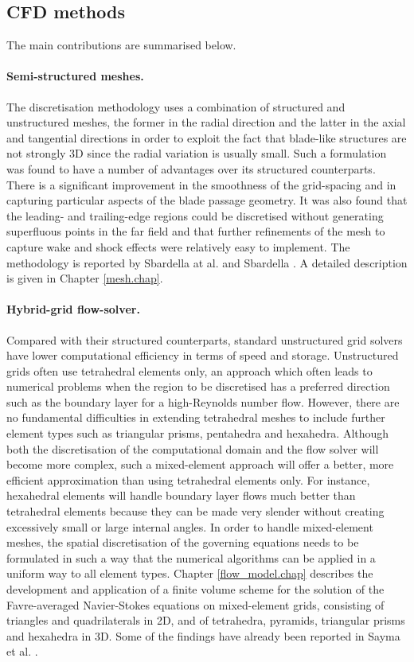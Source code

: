 \subsection{CFD methods}
 The main contributions are summarised below.
%
\paragraph{Semi-structured meshes.}
%
 The discretisation methodology uses a combination of structured and unstructured meshes,
 the former in the radial direction and the latter in the axial and tangential
 directions in order to exploit the fact that blade-like structures
 are not strongly 3D since the radial variation
 is usually small. Such a formulation was found to
 have a number of advantages over its structured counterparts.
 There is a significant improvement
 in the smoothness of the grid-spacing and in capturing
 particular aspects of the blade passage geometry. It was also found that
 the leading- and trailing-edge regions could be  discretised without generating
 superfluous points in the far field and that further refinements of the mesh  
 to capture wake and shock effects were relatively easy to implement.
 The methodology is reported by Sbardella at al. \citeyear{Luca:3,Luca:9}
 and Sbardella \citeyear{Luca:5}. A detailed description is given in
 Chapter \ref{mesh.chap}.
%
\paragraph{Hybrid-grid flow-solver.}
%
 Compared with their structured counterparts, standard unstructured grid
 solvers have lower computational efficiency in terms of speed and storage.
 Unstructured grids often use tetrahedral elements only,
 an approach which often leads to numerical problems when the region to be discretised
 has a preferred direction such as the boundary layer for a
 high-Reynolds number flow. However, there are no fundamental difficulties in 
 extending tetrahedral meshes to include further element types such as triangular prisms,
 pentahedra and hexahedra.
 Although both the discretisation of the computational domain and the flow solver
 will become more complex,  such a mixed-element approach will offer
 a better, more efficient approximation than using tetrahedral elements only.
 For instance, hexahedral elements will handle boundary layer flows much better
 than tetrahedral elements because they can be made very slender without
 creating excessively small or large internal angles. 
 In order to handle mixed-element meshes, the spatial discretisation
 of the governing equations needs to be formulated in such a way
 that the numerical algorithms can be applied in a uniform way to all
 element types.
 Chapter \ref{flow_model.chap} describes the development and application
 of a finite volume scheme for the solution of the
 Favre-averaged Navier-Stokes equations on mixed-element grids, consisting
 of triangles and quadrilaterals in 2D, and of tetrahedra, pyramids, 
 triangular prisms and hexahedra in 3D.
 Some of the findings have already been reported in
 Sayma et al. \citeyear{Luca:10}.
%
%
